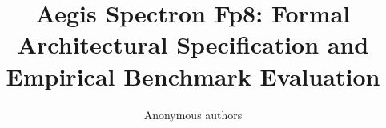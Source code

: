 \title{\textbf{Aegis Spectron Fp8: Formal Architectural Specification and Empirical Benchmark Evaluation}}

\author{Anonymous authors}

